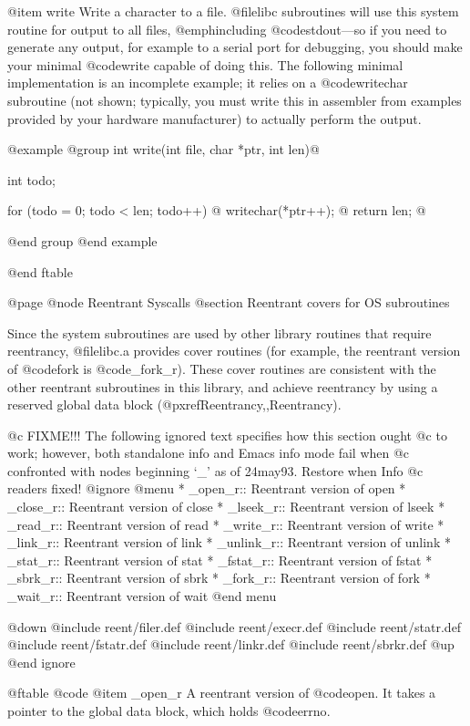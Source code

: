 @item write
Write a character to a file.  @file{libc} subroutines will use this
system routine for output to all files, @emph{including}
@code{stdout}---so if you need to generate any output, for example to a
serial port for debugging, you should make your minimal @code{write}
capable of doing this.  The following minimal implementation is an
incomplete example; it relies on a @code{writechar} subroutine (not
shown; typically, you must write this in assembler from examples
provided by your hardware manufacturer) to actually perform the output.

@example
@group
int write(int file, char *ptr, int len)@{
    int todo;
  
    for (todo = 0; todo < len; todo++) @{
        writechar(*ptr++);
    @}
    return len;
@}
@end group
@end example

@end ftable

@page
@node Reentrant Syscalls
@section Reentrant covers for OS subroutines

Since the system subroutines are used by other library routines that
require reentrancy, @file{libc.a} provides cover routines (for example,
the reentrant version of @code{fork} is @code{_fork_r}).  These cover
routines are consistent with the other reentrant subroutines in this
library, and achieve reentrancy by using a reserved global data block
(@pxref{Reentrancy,,Reentrancy}).

@c FIXME!!! The following ignored text specifies how this section ought
@c to work;  however, both standalone info and Emacs info mode fail when
@c confronted with nodes beginning `_' as of 24may93.  Restore when Info
@c readers fixed!
@ignore
@menu
* _open_r::	Reentrant version of open
* _close_r::	Reentrant version of close
* _lseek_r::	Reentrant version of lseek
* _read_r::	Reentrant version of read
* _write_r::	Reentrant version of write
* _link_r::     Reentrant version of link
* _unlink_r::   Reentrant version of unlink
* _stat_r::     Reentrant version of stat
* _fstat_r::    Reentrant version of fstat
* _sbrk_r::     Reentrant version of sbrk
* _fork_r::	Reentrant version of fork
* _wait_r::	Reentrant version of wait
@end menu

@down
@include reent/filer.def
@include reent/execr.def
@include reent/statr.def
@include reent/fstatr.def
@include reent/linkr.def
@include reent/sbrkr.def
@up
@end ignore

@ftable @code
@item _open_r
A reentrant version of @code{open}.  It takes a pointer
to the global data block, which holds @code{errno}.


